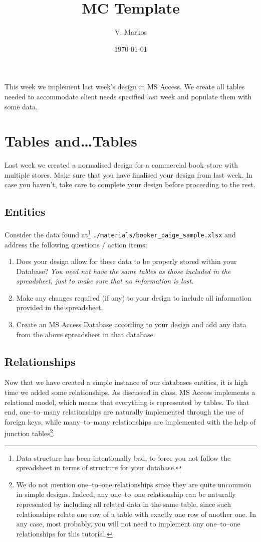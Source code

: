 \documentclass[a4paper, 10pt]{article}
\title{MC Template}
\author{V. Markos}
\date{\today}
\renewenvironment{abstract}
{\small
	\begin{center}
		\bfseries \abstractname\vspace{-.5em}\vspace{0pt}
	\end{center}
	\list{}{%
		\setlength{\leftmargin}{10em}
		\setlength{\rightmargin}{\leftmargin}%
	}%
	\item\relax}
{\endlist}
\begin{document}
	\maketitle
	
	\begin{abstract}
		This week we implement last week's design in MS Access. We create all tables needed to accommodate client needs specified last week and populate them with some data.
	\end{abstract}
	\section*{Tables and\ldots Tables}\label{sec:Tables and... Tables}
	Last week we created a normalised design for a commercial book--store with multiple stores. Make sure that you have finalised your design from last week. In case you haven't, take care to complete your design before proceeding to the rest.
	\subsection*{Entities}\label{subsec:Entities}
	Consider the data found at\footnote{Data structure has been intentionally bad, to force you not follow the spreadsheet in terms of structure for your database.} \texttt{./materials/booker\_paige\_sample.xlsx} and address the following questions / action items:
	\begin{enumerate}
		\item Does your design allow for these data to be properly stored within your Database? \textit{You need not have the same tables as those included in the spreadsheet, just to make sure that no information is lost.}
		\item Make any changes required (if any) to your design to include all information provided in the spreadsheet.
		\item Create an MS Access Database according to your design and add any data from the above spreadsheet in that database.
	\end{enumerate}
	\subsection*{Relationships}\label{subsec:Relationships}
	Now that we have created a simple instance of our databases entities, it is high time we added some relationships. As discussed in class, MS Access implements a relational model, which means that everything is represented by tables. To that end, one--to--many relationships are naturally implemented through the use of foreign keys, while many--to--many relationships are implemented with the help of junction tables\footnote{We do not mention one--to--one relationships since they are quite uncommon in simple designs. Indeed, any one--to--one relationship can be naturally represented by including all related data in the same table, since such relationships relate one row of a table with exactly one row of another one. In any case, most probably, you will not need to implement any one--to--one relationships for this tutorial.}.
	
\end{document}

